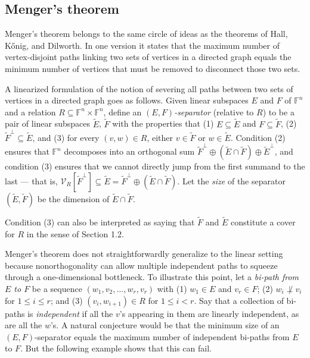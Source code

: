 \documentclass[10pt,a4paper]{amsart}
\begin{document}
\subsection{Menger's theorem}

Menger's theorem belongs to the same circle of ideas as the theorems of Hall, Kőnig, and Dilworth. In one version it states that the maximum number of vertex-disjoint paths linking two sets of vertices in a directed graph equals the minimum number of vertices that must be removed to disconnect those two sets.

A linearized formulation of the notion of severing all paths between two sets of vertices in a directed graph goes as follows. Given linear subspaces $E$ and $F$ of $\mathbb{F}^n$ and a relation $R \subseteq \mathbb{F}^n \times \mathbb{F}^n$, define an {\it $(E,F)$-separator} (relative to $R$) to be a pair of linear subspaces $\tilde{E}$, $\tilde{F}$ with the properties that (1) $E \subseteq \tilde{E}$ and $F \subseteq \tilde{F}$, (2) $\tilde{F}^\perp \subseteq \tilde{E}$, and (3) for every $(v,w) \in R$, either $v \in \tilde{F}$ or $w \in \tilde{E}$. Condition (2) ensures that $\mathbb{F}^n$ decomposes into an orthogonal sum $\tilde{F}^\perp \oplus (\tilde{E} \cap \tilde{F}) \oplus \tilde{E}^\perp$, and condition (3) ensures that we cannot directly jump from the first summand to the last --- that is, $\mathcal{V}_R[\tilde{F}^\perp] \subseteq \tilde{E} = \tilde{F}^\perp \oplus (\tilde{E} \cap \tilde{F})$. Let the {\it size} of the separator $(\tilde{E}, \tilde{F})$ be the dimension of $\tilde{E} \cap \tilde{F}$.

Condition (3) can also be interpreted as saying that $\tilde{F}$ and $\tilde{E}$ constitute a cover for $R$ in the sense of Section 1.2.

Menger's theorem does not straightforwardly generalize to the linear setting because nonorthogonality can allow multiple independent paths to squeeze through a one-dimensional bottleneck. To illustrate this point, let a {\it bi-path from $E$ to $F$} be a sequence $(w_1, v_2, \ldots, w_r, v_r)$ with (1) $w_1 \in E$ and $v_r \in F$; (2) $w_i \not\perp v_i$ for $1 \leq i \leq r$; and (3) $(v_i, w_{i+1}) \in R$ for $1 \leq i < r$. Say that a collection of bi-paths is {\it independent} if all the $v$'s appearing in them are linearly independent, as are all the $w$'s. A natural conjecture would be that the minimum size of an $(E,F)$-separator equals the maximum number of independent bi-paths from $E$ to $F$. But the following example shows that this can fail.
\end{document}
